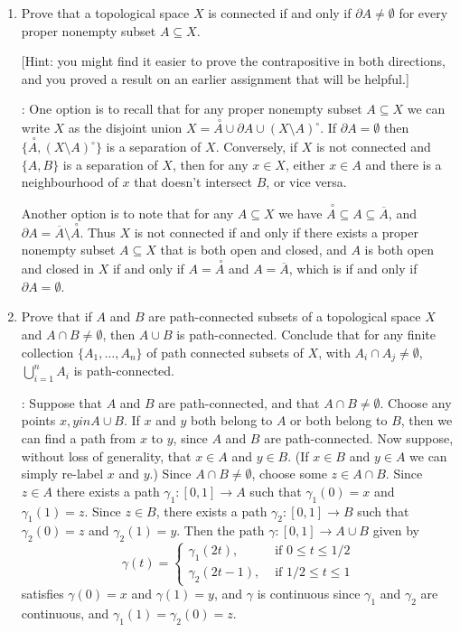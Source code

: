 \documentclass[letterpaper,12pt]{article}
\newcommand{\inter}[1]{\overset{\,\,\circ}{#1}}
\begin{document}
\begin{enumerate}
\bigskip

\item Prove that a topological space $X$ is connected if and only if $\partial A\neq \emptyset$ for every proper nonempty subset $A\subseteq X$.

[Hint: you might find it easier to prove the contrapositive in both directions, and you proved a result on an earlier assignment that will be helpful.]

\bigskip

: One option is to recall that for any proper nonempty subset $A\subseteq X$ we can write $X$ as the disjoint union $X=\inter{A}\cup\partial A\cup (X\setminus A)^\circ$. If $\partial A=\emptyset$ then $\{\inter{A},(X\setminus A)^\circ\}$ is a separation of $X$. Conversely, if $X$ is not connected and $\{A,B\}$ is a separation of $X$, then for any $x\in X$, either $x\in A$ and there is a neighbourhood of $x$ that doesn't intersect $B$, or vice versa.

Another option is to note that for any $A\subseteq X$ we have $\inter{A}\subseteq A\subseteq \overline{A}$, and $\partial A = \overline{A}\setminus \inter{A}$. Thus $X$ is not connected if and only if there exists a proper nonempty subset $A\subseteq X$ that is both open and closed, and $A$ is both open and closed in $X$ if and only if $A=\inter{A}$ and $A=\overline{A}$, which is if and only if $\partial A = \emptyset$.

\bigskip

\item Prove that if $A$ and $B$ are path-connected subsets of a topological space $X$ and $A\cap B\neq \emptyset$, then $A\cup B$ is path-connected. Conclude that for any finite collection $\{A_1,\ldots, A_n\}$ of path connected subsets of $X$, with $A_i\cap A_j\neq \emptyset$,  $\bigcup_{i=1}^nA_i$ is path-connected.

\bigskip

: Suppose that $A$ and $B$ are path-connected, and that $A\cap B\neq \emptyset$. Choose any points $x,y
in A\cup B$. If $x$ and $y$ both belong to $A$ or both belong to $B$, then we can find a path from $x$ to $y$, since $A$ and $B$ are path-connected. Now suppose, without loss of generality, that $x\in A$ and $y\in B$. (If $x\in B$ and $y\in A$ we can simply re-label $x$ and $y$.) Since $A\cap B\neq\emptyset$, choose some $z\in A\cap B$. Since $z\in A$ there exists a path $\gamma_1:[0,1]\to A$ such that $\gamma_1(0)=x$ and $\gamma_1(1)=z$. Since $z\in B$, there exists a path $\gamma_2:[0,1]\to B$ such that $\gamma_2(0)=z$ and $\gamma_2(1)=y$. Then the path $\gamma:[0,1]\to A\cup B$ given by
\[
 \gamma(t) = \begin{cases}\gamma_1(2t), & \text{ if } 0\leq t\leq 1/2\\\gamma_2(2t-1), & \text{ if } 1/2\leq t\leq 1\end{cases}
\]
satisfies $\gamma(0)=x$ and $\gamma(1)=y$, and $\gamma$ is continuous since $\gamma_1$ and $\gamma_2$ are continuous, and $\gamma_1(1)=\gamma_2(0)=z$.


\end{enumerate}
\end{document}
